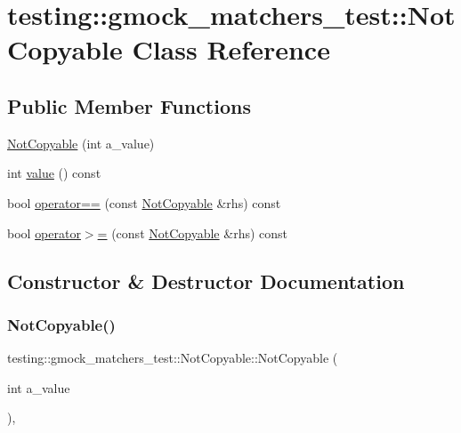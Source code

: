 \hypertarget{classtesting_1_1gmock__matchers__test_1_1NotCopyable}{}\section{testing\+::gmock\+\_\+matchers\+\_\+test\+::Not\+Copyable Class Reference}
\label{classtesting_1_1gmock__matchers__test_1_1NotCopyable}
\subsection*{Public Member Functions}
\begin{DoxyCompactItemize}
\item 
\mbox{\hyperlink{classtesting_1_1gmock__matchers__test_1_1NotCopyable_a3d15763c115415a26d8acc9ce5a26e19}{Not\+Copyable}} (int a\+\_\+value)
\item 
int \mbox{\hyperlink{classtesting_1_1gmock__matchers__test_1_1NotCopyable_af6c134767462948fa8dbd35c68370004}{value}} () const
\item 
bool \mbox{\hyperlink{classtesting_1_1gmock__matchers__test_1_1NotCopyable_a2e68fcd9a588a184d54e6b54e41fb978}{operator==}} (const \mbox{\hyperlink{classtesting_1_1gmock__matchers__test_1_1NotCopyable}{Not\+Copyable}} \&rhs) const
\item 
bool \mbox{\hyperlink{classtesting_1_1gmock__matchers__test_1_1NotCopyable_a36eb6a25f5559bee00fe52a6d86b42d6}{operator$>$=}} (const \mbox{\hyperlink{classtesting_1_1gmock__matchers__test_1_1NotCopyable}{Not\+Copyable}} \&rhs) const
\end{DoxyCompactItemize}


\subsection{Constructor \& Destructor Documentation}
\mbox{\label{classtesting_1_1gmock__matchers__test_1_1NotCopyable_a3d15763c115415a26d8acc9ce5a26e19}} 
\subsubsection{\texorpdfstring{NotCopyable()}{NotCopyable()}}
{\footnotesize\ttfamily testing\+::gmock\+\_\+matchers\+\_\+test\+::\+Not\+Copyable\+::\+Not\+Copyable (\begin{DoxyParamCaption}\item[{int}]{a\+\_\+value }\end{DoxyParamCaption})\hspace{0.3cm}{\ttfamily [inline]}, {\ttfamily [explicit]}}




